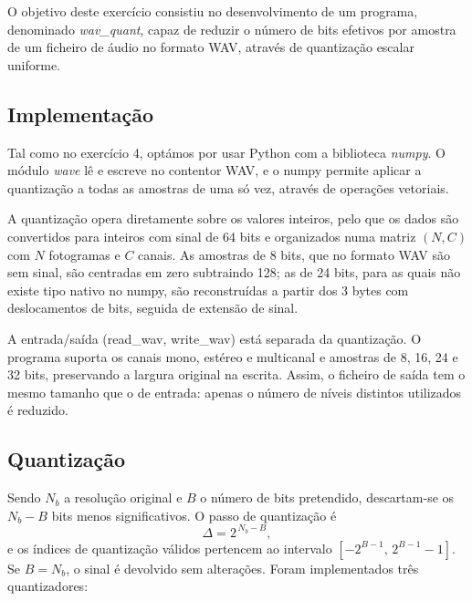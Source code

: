 \documentclass[11pt,a4paper]{report}
\begin{document}
O objetivo deste exercício consistiu no desenvolvimento de um programa, denominado \emph{wav\_quant}, capaz de reduzir o número de bits efetivos por amostra de um ficheiro de áudio no formato WAV, através de quantização escalar uniforme.

\subsection{Implementação}

Tal como no exercício 4, optámos por usar Python com a biblioteca \emph{numpy}. O módulo \emph{wave} lê e escreve no contentor WAV, e o numpy permite aplicar a quantização a todas as amostras de uma só vez, através de operações vetoriais.

A quantização opera diretamente sobre os valores inteiros, pelo que os dados são convertidos para inteiros com sinal de 64 bits e organizados numa matriz $(N, C)$ com $N$ fotogramas e $C$ canais. As amostras de 8 bits, que no formato WAV são sem sinal, são centradas em zero subtraindo 128; as de 24 bits, para as quais não existe tipo nativo no numpy, são reconstruídas a partir dos 3 bytes com deslocamentos de bits, seguida de extensão de sinal.

A entrada/saída (read\_wav, write\_wav) está separada da quantização. O programa suporta os canais mono, estéreo e multicanal e amostras de 8, 16, 24 e 32 bits, preservando a largura original na escrita. Assim, o ficheiro de saída tem o mesmo tamanho que o de entrada: apenas o número de níveis distintos utilizados é reduzido.

\subsection{Quantização}

Sendo $N_b$ a resolução original e $B$ o número de bits pretendido, descartam-se os $N_b - B$ bits menos significativos. O passo de quantização é
\[
\Delta = 2^{\,N_b - B},
\]
e os índices de quantização válidos pertencem ao intervalo $[-2^{B-1},\, 2^{B-1}-1]$. Se $B = N_b$, o sinal é devolvido sem alterações. Foram implementados três quantizadores:
\end{document}
